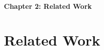 

\cleardoublepage %
\thispagestyle{plain} %

\vspace*{\fill}
\begin{center}
    {\Huge\bfseries Chapter 2: Related Work \par}
    \vspace{1cm}
\end{center}
\vspace*{\fill}
\clearpage %

\chapter{Related Work}  %
\label{chap:related_work}






